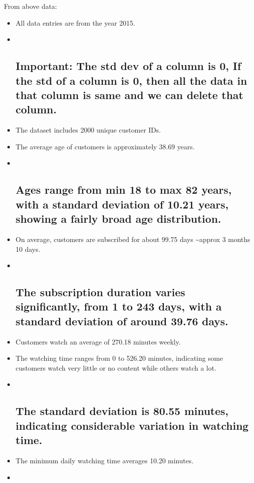 \documentclass[11pt]{article}
\begin{document}
    From above data:

\begin{itemize}
\item
  All data entries are from the year 2015.
\item ~
  \subsection{\texorpdfstring{\textbf{Important}: The std dev of a
  column is 0, If the std of a column is 0, then all the data in that
  column is same and we can \textbf{delete} that
  column.}{Important: The std dev of a column is 0, If the std of a column is 0, then all the data in that column is same and we can delete that column.}}\label{important-the-std-dev-of-a-column-is-0-if-the-std-of-a-column-is-0-then-all-the-data-in-that-column-is-same-and-we-can-delete-that-column.}
\item
  The dataset includes 2000 unique customer IDs.
\item
  The average age of customers is approximately 38.69 years.
\item ~
  \subsection{Ages range from min 18 to max 82 years, with a standard
  deviation of 10.21 years, showing a fairly broad age
  distribution.}\label{ages-range-from-min-18-to-max-82-years-with-a-standard-deviation-of-10.21-years-showing-a-fairly-broad-age-distribution.}
\item
  On average, customers are subscribed for about 99.75 days
  \textasciitilde approx 3 months 10 days.
\item ~
  \subsection{The subscription duration varies significantly, from 1 to
  243 days, with a standard deviation of around 39.76
  days.}\label{the-subscription-duration-varies-significantly-from-1-to-243-days-with-a-standard-deviation-of-around-39.76-days.}
\item
  Customers watch an average of 270.18 minutes weekly.
\item
  The watching time ranges from 0 to 526.20 minutes, indicating some
  customers watch very little or no content while others watch a lot.
\item ~
  \subsection{The standard deviation is 80.55 minutes, indicating
  considerable variation in watching
  time.}\label{the-standard-deviation-is-80.55-minutes-indicating-considerable-variation-in-watching-time.}
\item
  The minimum daily watching time averages 10.20 minutes.
\item ~

\end{itemize}
\end{document}
